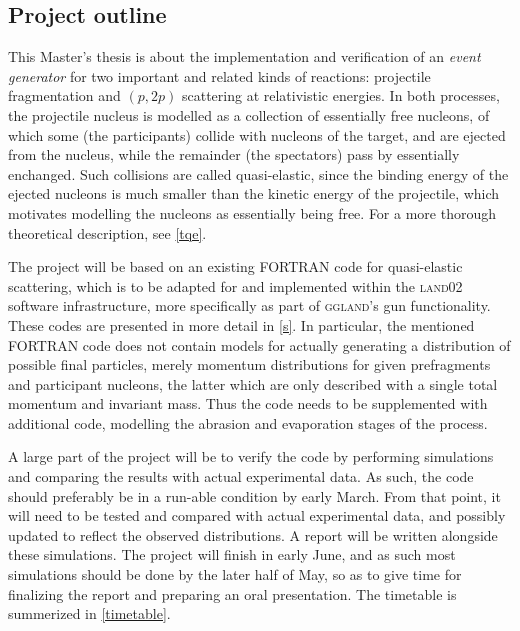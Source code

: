 \documentclass[12pt, a4paper]{article}
\begin{document}
\subsection{Project outline}
This Master's thesis is about the implementation and verification of an \emph{event generator} for two important and related kinds of reactions: projectile fragmentation and $(p,2p)$ scattering at relativistic energies.
In both processes, the projectile nucleus is modelled as a collection of essentially free nucleons, of which some (the participants) collide with nucleons of the target, and are ejected from the nucleus, while the remainder (the spectators) pass by essentially enchanged. Such collisions are called quasi-elastic, since the binding energy of the ejected nucleons is much smaller than the kinetic energy of the projectile, which motivates modelling the nucleons as essentially being free.
For a more thorough theoretical description, see \autoref{tqe}.

The project will be based on an existing FORTRAN code for quasi-elastic scattering, which is to be adapted for and implemented within the \textsc{land02} software infrastructure, more specifically as part of \textsc{ggland}'s gun functionality. These codes are presented in more detail in \autoref{s}. In particular, the mentioned FORTRAN code does not contain models for actually generating a distribution of possible final particles, merely momentum distributions for given prefragments and participant nucleons, the latter which are only described with a single total momentum and invariant mass. Thus the code needs to be supplemented with additional code, modelling the abrasion and evaporation stages of the process.

A large part of the project will be to verify the code by performing simulations and comparing the results with actual experimental data. As such, the code should preferably be in a run-able condition by early March. From that point, it will need to be tested and compared with actual experimental data, and possibly updated to reflect the observed distributions. A report will be written alongside these simulations. The project will finish in early June, and as such most simulations should be done by the later half of May, so as to give time for finalizing the report and preparing an oral presentation. The timetable is summerized in \autoref{timetable}.
\end{document}
